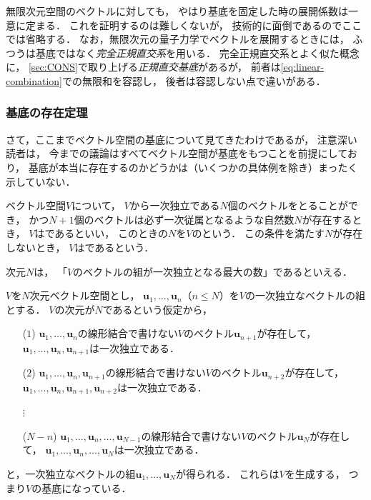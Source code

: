 \documentclass[
]{sotsu}
\begin{document}
無限次元空間のベクトルに対しても，
やはり基底を固定した時の展開係数は一意に定まる．
これを証明するのは難しくないが，
技術的に面倒であるのでここでは省略する．
なお，無限次元の量子力学でベクトルを展開するときには，
ふつうは基底ではなく\emph{完全正規直交系}を用いる．
完全正規直交系とよく似た概念に，
\cref{sec:CONS}で取り上げる\emph{正規直交基底}があるが，
前者は\cref{eq:linear-combination}での無限和を容認し，
後者は容認しない点で違いがある．



\subsubsection{基底の存在定理}

さて，ここまでベクトル空間の基底について見てきたわけであるが，
注意深い読者は，
今までの議論はすべてベクトル空間が基底をもつことを前提にしており，
基底が本当に存在するのかどうかは（いくつかの具体例を除き）まったく示していない．

ベクトル空間$V$について，
$V$から一次独立である$N$個のベクトルをとることができ，
かつ$N + 1$個のベクトルは必ず一次従属となるような自然数$N$が存在するとき，
$V$はであるといい，
このときの$N$を$V$のという．
この条件を満たす$N$が存在しないとき，
$V$はであるという．

次元$N$は，
「$V$のベクトルの組が一次独立となる最大の数」であるといえる．

\quad 
$V$を$N$次元ベクトル空間とし，
$\symbf{u}_1, \dots, \symbf{u}_n$（$n \leq N$）を$V$の一次独立なベクトルの組とする．
$V$の次元が$N$であるという仮定から，
\begin{enumerate}[leftmargin={6em}]
    \item[($1$) ] $\symbf{u}_1, \dots, \symbf{u}_n$の線形結合で書けない$V$のベクトル$\symbf{u}_{n+1}$が存在して，
        $\symbf{u}_1, \dots, \symbf{u}_n, \symbf{u}_{n+1}$は一次独立である．
    \item[($2$) ] $\symbf{u}_1, \dots, \symbf{u}_n, \symbf{u}_{n+1}$の線形結合で書けない$V$のベクトル$\symbf{u}_{n+2}$が存在して，
        $\symbf{u}_1, \dots, \symbf{u}_n, \symbf{u}_{n+1}, \symbf{u}_{n+2}$は一次独立である．
    \item[$\vdots$ ] 
    \item[($N-n$) ] $\symbf{u}_1, \dots, \symbf{u}_n, \dots, \symbf{u}_{N-1}$の線形結合で書けない$V$のベクトル$\symbf{u}_N$が存在して，
        $\symbf{u}_1, \dots, \symbf{u}_n, \dots, \symbf{u}_N$は一次独立である．
\end{enumerate}
と，一次独立なベクトルの組$\symbf{u}_1, \dots, \symbf{u}_N$が得られる．
これらは$V$を生成する，
つまり$V$の基底になっている．
\end{document}
